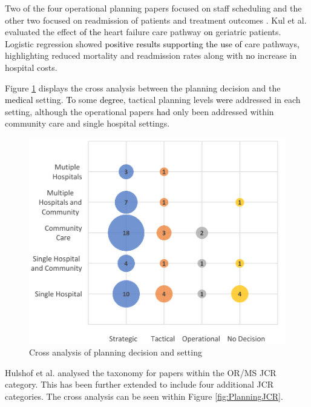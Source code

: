 \documentclass[../thesis.tex]{subfiles}
\begin{document}
Two of the four operational planning papers focused on staff scheduling \cite{Eveborn,Grenouilleau} and the other two focused on readmission of patients \cite{Gordon1} and treatment outcomes \cite{Kul}. Kul et al. \cite{Kul} evaluated the effect \textcolor{black}{of the} heart failure care pathway \textcolor{black}{on} geriatric patients. Logistic regression showed \textcolor{black}{positive results supporting the use of} care pathways\textcolor{black}{,} highlighting reduced mortality and readmission rates along with \textcolor{black}{no} increase in hospital costs.

Figure \ref{fig:PlanningSetting} displays the cross analysis between the planning decision and the \textcolor{black}{medical} setting. \textcolor{black}{To} some \textcolor{black}{degree}, tactical planning levels \textcolor{black}{were} addressed in each setting, although the operational papers \textcolor{black}{had} only been addressed within community care and single hospital settings. 

\begin{figure}[H]
\centering
        \includegraphics[scale = 0.6]{Chapter2/Figures/PlanningSetting1.pdf}
        \caption{Cross analysis of planning decision and setting}
    \label{fig:PlanningSetting}
\end{figure}

Hulshof et al. \cite{PHulshof} analysed the taxonomy for papers within the OR/MS JCR category. This has been further extended to include four additional JCR categories. The cross analysis can be seen within Figure \ref{fig:PlanningJCR}.
\end{document}
